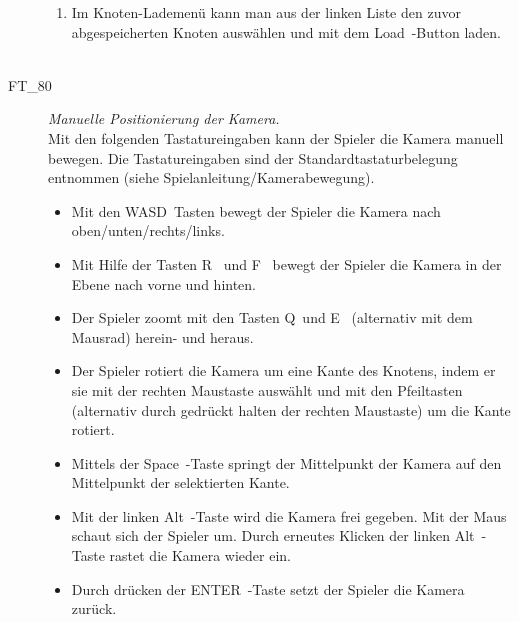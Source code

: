 \begin{description}
\begin{enumerate}
		\item Im Knoten-Lademenü kann man aus der linken Liste den zuvor abgespeicherten Knoten auswählen und mit dem \glqq Load\grqq~-Button laden.
		~\\
		
	\end{enumerate}
	
	

\label{FT:80}
	
	\item[FT\_80] \textit{Manuelle Positionierung der Kamera.} \hfill\\
	
	Mit den folgenden Tastatureingaben kann der Spieler die Kamera manuell bewegen. Die Tastatureingaben sind der Standardtastaturbelegung entnommen (siehe Spielanleitung/Kamerabewegung).
	
	\begin{itemize} 
	
        \item Mit den \glqq WASD\grqq~Tasten bewegt der Spieler die Kamera nach oben/unten/rechts/links.
        
        \item Mit Hilfe der Tasten \glqq R\grqq~ und \glqq F\grqq~ bewegt der Spieler die Kamera in der Ebene nach vorne und hinten.
        
        \item Der Spieler zoomt mit den Tasten \glqq Q\grqq~und \glqq E\grqq~ (alternativ mit dem Mausrad) herein- und heraus.
        
        \item Der Spieler rotiert die Kamera um eine Kante des Knotens, indem er sie mit der rechten Maustaste auswählt und mit den Pfeiltasten (alternativ durch gedrückt halten der rechten Maustaste) um die Kante rotiert.
        
        \item Mittels der \glqq Space\grqq~-Taste springt der Mittelpunkt der Kamera auf den Mittelpunkt der selektierten Kante.
        
        \item Mit der linken \glqq Alt\grqq~-Taste wird die Kamera frei gegeben. Mit der Maus schaut sich der Spieler um. Durch erneutes Klicken der linken \glqq Alt\grqq~-Taste rastet die Kamera wieder ein.
        
        \item Durch drücken der \glqq ENTER\grqq~-Taste setzt der Spieler die Kamera zurück.
        

\end{itemize}
\end{description}
